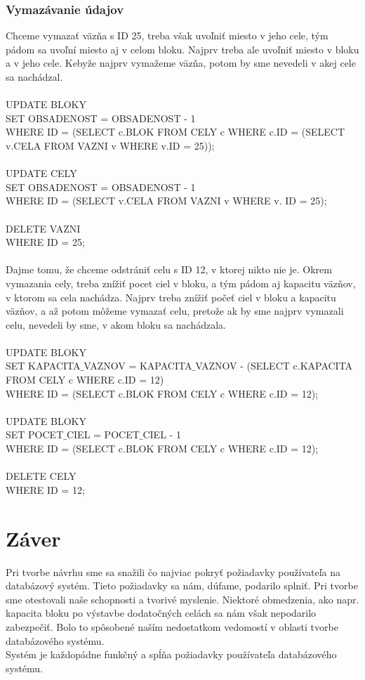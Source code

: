 \documentclass[slovak, 12pt, Times New Roman]{article}
\begin{document}
			\subsubsection{Vymazávanie údajov}
				Chceme vymazať väzňa s ID 25, treba však uvoľniť miesto v jeho cele, tým pádom sa uvoľní miesto aj v celom bloku.
				Najprv treba ale uvoľniť miesto v bloku a v jeho cele. Kebyže najprv vymažeme väzňa, potom by sme nevedeli v akej cele sa nachádzal. \\
				\\
				UPDATE BLOKY\\
				SET OBSADENOST = OBSADENOST - 1\\
				WHERE ID = (SELECT c.BLOK FROM CELY c WHERE c.ID = (SELECT v.CELA FROM VAZNI v WHERE v.ID = 25));\\
				\\
				UPDATE CELY\\
				SET OBSADENOST = OBSADENOST - 1\\
				WHERE ID = (SELECT v.CELA FROM VAZNI v WHERE v. ID = 25);\\
				\\
				DELETE VAZNI\\
				WHERE ID = 25;\\
				\\
				Dajme tomu, že chceme odstrániť celu s ID 12, v ktorej nikto nie je. Okrem vymazania cely, treba znížiť pocet ciel v bloku, a tým pádom aj kapacitu väzňov, v ktorom sa cela nachádza. Najprv treba znížiť počeť ciel v bloku a kapacitu väzňov, a až potom môžeme vymazať celu, pretože ak by sme najprv vymazali celu, nevedeli by sme, v akom bloku sa nachádzala.\\
				\\
				UPDATE BLOKY\\
				SET KAPACITA$\_$VAZNOV = KAPACITA$\_$VAZNOV - (SELECT c.KAPACITA FROM CELY c WHERE c.ID = 12)\\
				WHERE ID = (SELECT c.BLOK FROM CELY c WHERE c.ID = 12);\\
				\\
				UPDATE BLOKY\\
				SET POCET$\_$CIEL = POCET$\_$CIEL - 1\\
				WHERE ID = (SELECT c.BLOK FROM CELY c WHERE c.ID = 12);\\
				\\
				DELETE CELY\\
				WHERE ID = 12;\\
	\section{Záver}
		Pri tvorbe návrhu sme sa snažili čo najviac pokryť požiadavky používateľa na databázový systém. Tieto požiadavky sa nám, dúfame, podarilo splniť. Pri tvorbe sme otestovali naše schopnosti a tvorivé myslenie. Niektoré obmedzenia, ako napr. kapacita bloku po výstavbe dodatočných celách sa nám však nepodarilo zabezpečiť. Bolo to spôsobené naším nedostatkom vedomostí v oblasti tvorbe databázového systému. \\
		Systém je každopádne funkčný a spĺňa požiadavky používateľa databázového systému. 
\end{document}
